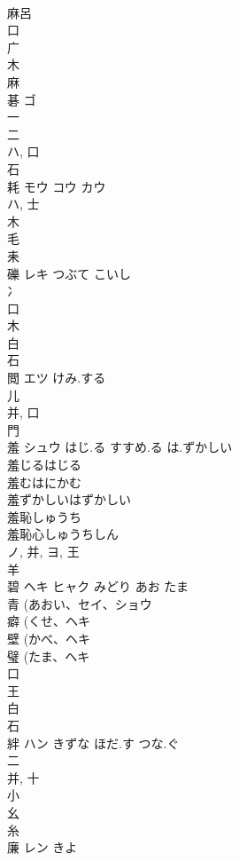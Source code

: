 \documentclass[8pt]{extreport}
\begin{document}
\begin{CJK}{UTF8}{min}
\\	麻呂 
\\	口 
\\	广 
\\	木 
\\	麻 
\\	碁	ゴ		
\\	一 
\\	二 
\\	ハ, 口 
\\	石 
\\	耗	モウ コウ カウ		
\\	ハ, 士 
\\	木 
\\	毛 
\\	耒 
\\	礫	レキ	つぶて こいし	
\\	冫 
\\	口 
\\	木 
\\	白 
\\	石 
\\	閲	エツ	けみ.する	
\\	儿 
\\	并, 口 
\\	門 
\\	羞	シュウ	はじ.る すすめ.る は.ずかしい	
\\	羞じるはじる
\\	羞むはにかむ
\\	羞ずかしいはずかしい
\\	羞恥しゅうち
\\	羞恥心しゅうちしん
\\	ノ, 并, ヨ, 王 
\\	羊 
\\	碧	ヘキ ヒャク	みどり あお たま	
\\	青 (あおい、セイ、ショウ 
\\	癖 (くせ、ヘキ 
\\	壁 (かべ、ヘキ 
\\	璧 (たま、ヘキ 
\\	口 
\\	王 
\\	白 
\\	石 
\\	絆	ハン	きずな ほだ.す つな.ぐ	
\\	二 
\\	并, 十 
\\	小 
\\	幺 
\\	糸 
\\	廉	レン	きよ	

\end{CJK}
\end{document}

